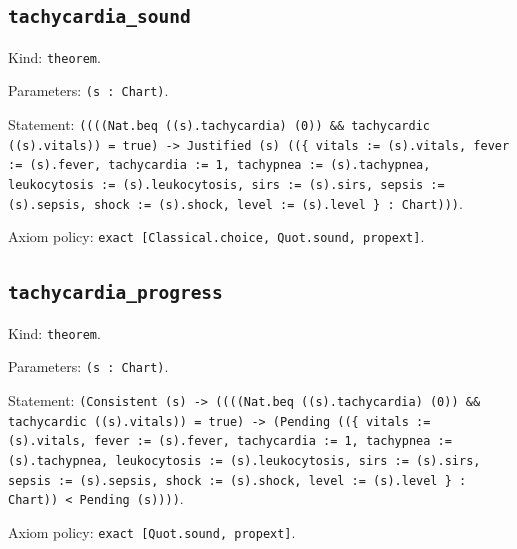 \documentclass[11pt]{article}
\begin{document}
\subsection*{\texttt{tachycardia\_sound}}
\noindent Kind: \texttt{theorem}.\par
\noindent Parameters: \texttt{(s : Chart)}.\par
\noindent Statement: \texttt{((((Nat.beq ((s).tachycardia) (0)) \&\& tachycardic ((s).vitals)) = true) -> Justified (s) ((\{ vitals := (s).vitals, fever := (s).fever, tachycardia := 1, tachypnea := (s).tachypnea, leukocytosis := (s).leukocytosis, sirs := (s).sirs, sepsis := (s).sepsis, shock := (s).shock, level := (s).level \} : Chart)))}.\par
\noindent Axiom policy: \texttt{exact [Classical.choice, Quot.sound, propext]}.\par
\subsection*{\texttt{tachycardia\_progress}}
\noindent Kind: \texttt{theorem}.\par
\noindent Parameters: \texttt{(s : Chart)}.\par
\noindent Statement: \texttt{(Consistent (s) -> ((((Nat.beq ((s).tachycardia) (0)) \&\& tachycardic ((s).vitals)) = true) -> (Pending ((\{ vitals := (s).vitals, fever := (s).fever, tachycardia := 1, tachypnea := (s).tachypnea, leukocytosis := (s).leukocytosis, sirs := (s).sirs, sepsis := (s).sepsis, shock := (s).shock, level := (s).level \} : Chart)) < Pending (s))))}.\par
\noindent Axiom policy: \texttt{exact [Quot.sound, propext]}.\par
\end{document}
